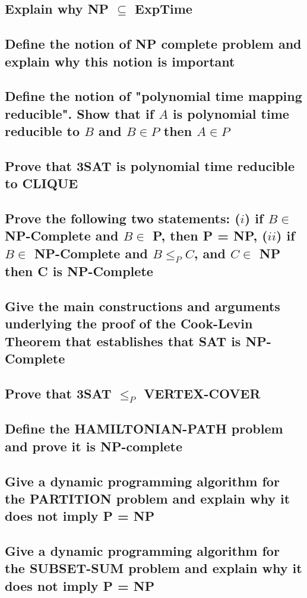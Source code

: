 \documentclass[main.tex]{subfiles}
\begin{document}
\subsection{Explain why NP $\subseteq$ ExpTime}

\subsection{Define the notion of NP complete problem and explain why this notion is important}

\subsection{Define the notion of "polynomial time mapping reducible". Show that if $A$ is polynomial time reducible to $B$ and $B \in P$ then $A \in P$}

\subsection{Prove that 3SAT is polynomial time reducible to CLIQUE}

\subsection{Prove the following two statements: ($i$) if $B \in$ NP-Complete and $B \in$ P, then P = NP, ($ii$) if $B \in$ NP-Complete and $B \leq_{P} C$, and $C \in$ NP then C is NP-Complete}

\subsection{Give the main constructions and arguments underlying the proof of the Cook-Levin Theorem that establishes that SAT is NP-Complete}

\subsection{Prove that 3SAT $\leq_P$ VERTEX-COVER}

\subsection{Define the HAMILTONIAN-PATH problem and prove it is NP-complete}

\subsection{Give a dynamic programming algorithm for the PARTITION problem and explain why it does not imply P = NP}

\subsection{Give a dynamic programming algorithm for the SUBSET-SUM problem and explain why it does not imply P = NP}
\end{document}
